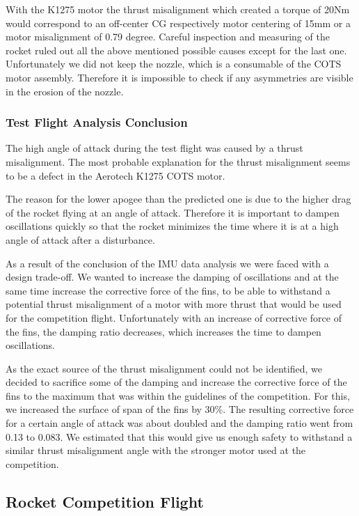 With the K1275 motor the thrust misalignment which created a torque of 20Nm would correspond to an off-center CG respectively motor centering of 15mm or a motor misalignment of 0.79 degree.
Careful inspection and measuring of the rocket ruled out all the above mentioned possible causes except for the last one. Unfortunately we did not keep the nozzle, which is a consumable of the COTS motor assembly. Therefore it is impossible to check if any asymmetries are visible in the erosion of the nozzle.

\subsubsection{Test Flight Analysis Conclusion}

The high angle of attack during the test flight was caused by a thrust misalignment. The most probable explanation for the thrust misalignment seems to be a defect in the Aerotech K1275 COTS motor.

The reason for the lower apogee than the predicted one is due to the higher drag of the rocket flying at an angle of attack. Therefore it is important to dampen oscillations quickly so that the rocket minimizes the time where it is at a high angle of attack after a disturbance.

As a result of the conclusion of the IMU data analysis we were faced with a design trade-off.
We wanted to increase the damping of oscillations and at the same time increase the corrective force of the fins, to be able to withstand a potential thrust misalignment of a motor with more thrust that would be used for the competition flight.
Unfortunately with an increase of corrective force of the fins, the damping ratio decreases, which increases the time to dampen oscillations.

As the exact source of the thrust misalignment could not be identified, we decided to sacrifice some of the damping and increase the corrective force of the fins to the maximum that was within the guidelines of the competition.
For this, we increased the surface of span of the fins by 30\%. The resulting corrective force for a certain angle of attack was about doubled and the damping ratio went from 0.13 to 0.083.
We estimated that this would give us enough safety to withstand a similar thrust misalignment angle with the stronger motor used at the competition.

\subsection{Rocket Competition Flight}


